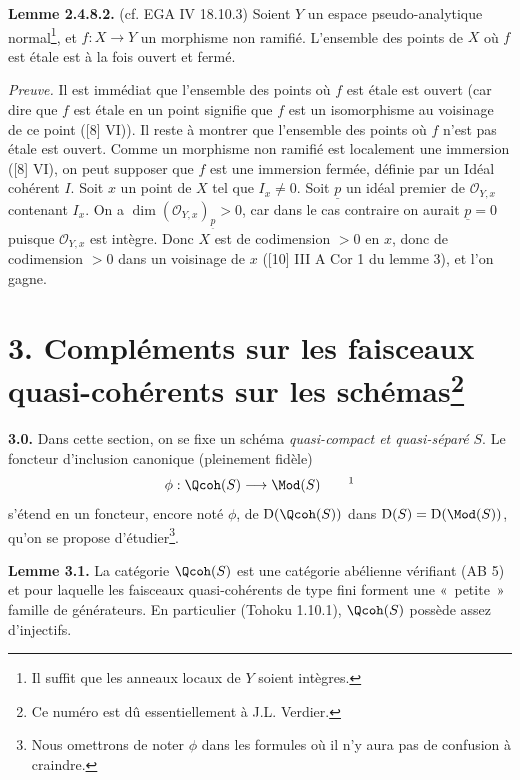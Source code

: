 \textbf{Lemme 2.4.8.2.} (cf. EGA IV 18.10.3) Soient $Y$ un espace pseudo-analytique normal\footnote{Il suffit que les anneaux locaux de $Y$ soient intègres.}, et $f:X\longrightarrow Y$ un morphisme non ramifié. L'ensemble des points de $X$ où $f$ est étale est à la fois ouvert et fermé.

\emph{Preuve.} Il est immédiat que l'ensemble des points où $f$ est étale est ouvert (car dire que $f$ est étale en un point signifie que $f$ est un isomorphisme au voisinage de ce point ([8] VI)). Il reste à montrer que l'ensemble des points où $f$ n'est pas étale est ouvert. Comme un morphisme non ramifié est localement une immersion ([8] VI), on peut supposer que $f$ est une immersion fermée, définie par un Idéal cohérent $I$. Soit $x$ un point de $X$ tel que $I_x\ne0$. Soit $\underline{p}$ un idéal premier de $\mathcal O_{Y,x}$ contenant $I_x$. On a $\dim(\mathcal O_{Y,x})_{\underline{p}}>0$, car dans le cas contraire on aurait $\underline{p}=0$ puisque $\mathcal O_{Y,x}$ est intègre. Donc $X$ est de codimension $>0$ en $x$, donc de codimension $>0$ dans un voisinage de $x$ ([10] III A Cor 1 du lemme 3), et l'on gagne.

\section*{3. Compléments sur les faisceaux quasi-cohérents sur les schémas\protect\footnote{Ce numéro est dû essentiellement à J.L. Verdier.}}

\textbf{3.0.} Dans cette section, on se fixe un schéma \emph{quasi-compact et quasi-séparé} $S$. Le foncteur d'inclusion canonique (pleinement fidèle)
\[
 \phi:\Qcoh(S)\longrightarrow\Mod(S)\qquad\text{\footnotemark}
\]
s'étend en un foncteur, encore noté $\phi$, de $\mathrm D(\Qcoh(S))$ dans $\mathrm D(S)=\mathrm D(\Mod(S))$, qu'on se propose d'étudier\footnote{Nous omettrons de noter $\phi$ dans les formules où il n'y aura pas de confusion à craindre.}.

\textbf{Lemme 3.1.} La catégorie $\Qcoh(S)$ est une catégorie abélienne vérifiant (AB 5) et pour laquelle les faisceaux quasi-cohérents de type fini forment une «~petite~» famille de générateurs. En particulier (Tohoku 1.10.1), $\Qcoh(S)$ possède assez d'injectifs.

